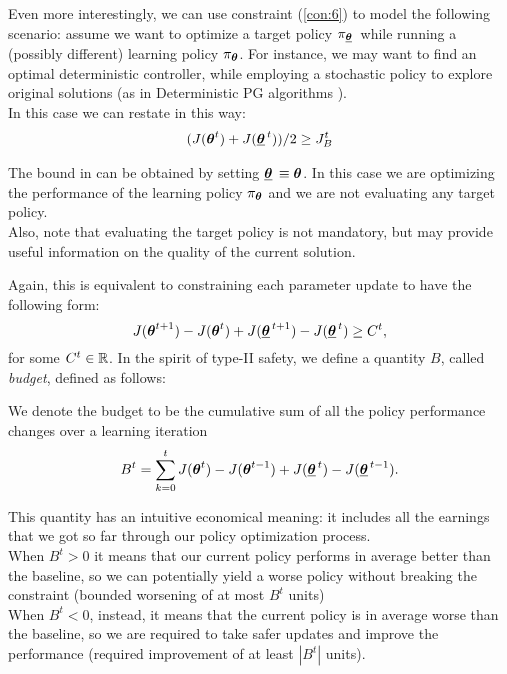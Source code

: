 Even more interestingly, we can use constraint (\ref{con:6}) to model the following scenario: assume we want to optimize a target policy $\pi_{\vtarget[]}$ while running a (possibly different) learning policy $\pi_{\vtheta}$. For instance, we may want to find an optimal deterministic controller, while employing a stochastic policy to explore original solutions (as in Deterministic PG algorithms \cite{silver2014deterministic}). \\
In this case we can restate  in this way:
\begin{align}\label{con:6target}
(J(\vtheta^t) + J(\vtarget))/2 \geq \jbase
\end{align}

\begin{note}
The bound in  can be obtained by setting $\vtarget[] \equiv \vtheta$. In this case we are optimizing the performance of the learning policy $\pi_{\vtheta}$ and we are not evaluating any target policy.\\
Also, note that evaluating the target policy is not mandatory, but may provide useful information on the quality of the current solution.
\end{note}

Again, this is equivalent to constraining each parameter update to have the following form:
\begin{equation}\label{con:type2}
J(\vtheta^{t+1}) - J(\vtheta^{t}) + J(\vtarget[t+1]) - J(\vtarget) \geq C^t,
\end{equation}
for some $C^t\in \realspace$.
%
In the spirit of type-II safety, we define a quantity $B$, called \textit{budget}, defined as follows:
\begin{definition}[Budget] We denote the budget to be the cumulative sum of all the policy performance changes over a learning iteration
\begin{equation}\label{eq:budget}
B^t =  \sum_{k=0}^{t} J(\vtheta^t) - J(\vtheta^{t-1}) + J(\vtarget) - J(\vtarget[t-1]).
\end{equation}
\end{definition}
This quantity has an intuitive economical meaning: it includes all the earnings that we got so far through our policy optimization process.\\ 
When $B^t > 0$ it means that our current policy performs in average better than the baseline, so we can potentially yield a worse policy without breaking the constraint (bounded worsening of at most $B^t$ units)\\
When $B^t<0$, instead, it means that the current policy is in average worse than the baseline, so we are required to take safer updates and improve the performance (required improvement of at least $|B^t|$ units). 


